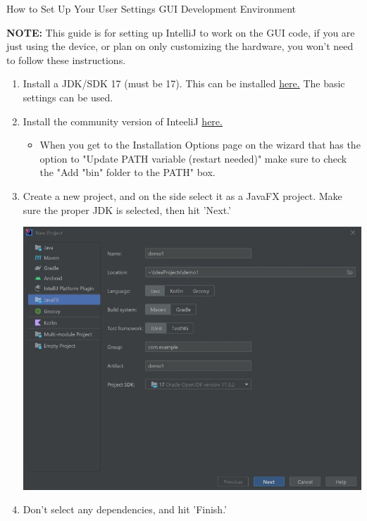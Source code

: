 \documentclass{article}
\begin{document}
\begin{center}
\Large{How to Set Up Your User Settings GUI Development Environment}
\end{center}

\textbf{NOTE:} This guide is for setting up IntelliJ to work on the GUI code, if you are just using the device, or plan on only customizing the hardware, you won't need to follow these instructions.

\begin{enumerate}
  \item Install a JDK/SDK 17 (must be 17). This can be installed \href{https://www.oracle.com/java/technologies/downloads/}{here.} The basic settings can be used.
  \item Install the community version of InteeliJ \href{https://www.jetbrains.com/idea/download/}{here.}
  \begin{itemize}
    \item When you get to the Installation Options page on the wizard that has the option to "Update PATH variable (restart needed)" make sure to check the "Add "bin" folder to the PATH" box.
  \end{itemize}
  \item Create a new project, and on the side select it as a JavaFX project. Make sure the proper JDK is selected, then hit 'Next.'
    \begin{center}
    \includegraphics{DevGuideNewProject}
    \end{center}
\newpage
  \item Don't select any dependencies, and hit 'Finish.'

\end{enumerate}
\end{document}
